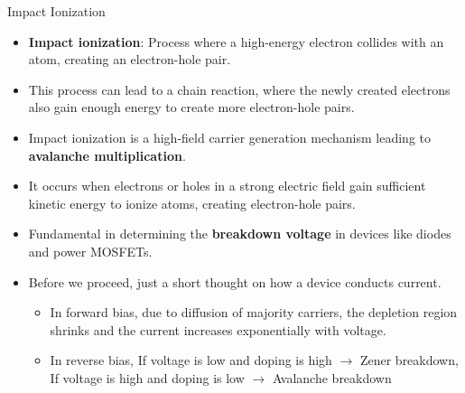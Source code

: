 \begin{frame}{Impact Ionization}
    \begin{itemize}
        \item \textbf{Impact ionization}: Process where a high-energy electron collides with an atom, creating an electron-hole pair.
        \item This process can lead to a chain reaction, where the newly created electrons also gain enough energy to create more electron-hole pairs.
        \item Impact ionization is a high-field carrier generation mechanism leading to \textbf{avalanche multiplication}.
        \item It occurs when electrons or holes in a strong electric field gain sufficient kinetic energy to ionize atoms, creating electron-hole pairs.
        \item Fundamental in determining the \textbf{breakdown voltage} in devices like diodes and power MOSFETs.
        \item Before we proceed, just a short thought on how a device conducts current.
            \begin{itemize}
                \item In forward bias, due to diffusion of majority carriers, the depletion region shrinks and the current increases exponentially with voltage.
                \item In reverse bias, If voltage is low and doping is high $\rightarrow$ Zener breakdown, \\
                If voltage is high and doping is low $\rightarrow$ Avalanche breakdown
            \end{itemize}
    \end{itemize}
\end{frame}    